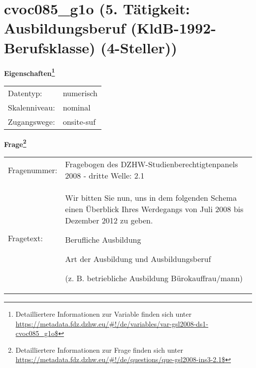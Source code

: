 
    \setcounter{footnote}{0}

    \vspace*{-1.8cm}
	\section{cvoc085\_g1o (5. Tätigkeit: Ausbildungsberuf (KldB-1992-Berufsklasse) (4-Steller))}
	\label{section:cvoc085_g1o}



    \vspace*{0.5cm}
    \noindent\textbf{Eigenschaften\footnote{Detailliertere Informationen zur Variable finden sich unter
		\url{https://metadata.fdz.dzhw.eu/\#!/de/variables/var-gsl2008-ds1-cvoc085_g1o$}}}\\
	\begin{tabularx}{\hsize}{@{}lX}
	Datentyp: & numerisch \\
	Skalenniveau: & nominal \\
	Zugangswege: &
	  onsite-suf
 \\
    \end{tabularx}



				\vspace*{0.5cm}
                \noindent\textbf{Frage\footnote{Detailliertere Informationen zur Frage finden sich unter
		              \url{https://metadata.fdz.dzhw.eu/\#!/de/questions/que-gsl2008-ins3-2.1$}}}\\
				\begin{tabularx}{\hsize}{@{}lX}
					Fragenummer: &
					  Fragebogen des DZHW-Studienberechtigtenpanels 2008 - dritte Welle:
					  2.1
 \\
					Fragetext: & Wir bitten Sie nun, uns in dem folgenden Schema einen Überblick Ihres Werdegangs von Juli 2008 bis Dezember 2012 zu geben.\par  Berufliche Ausbildung\par  Art der Ausbildung und Ausbildungsberuf\par  (z. B. betriebliche Ausbildung Bürokauffrau/mann) \\
				\end{tabularx}





